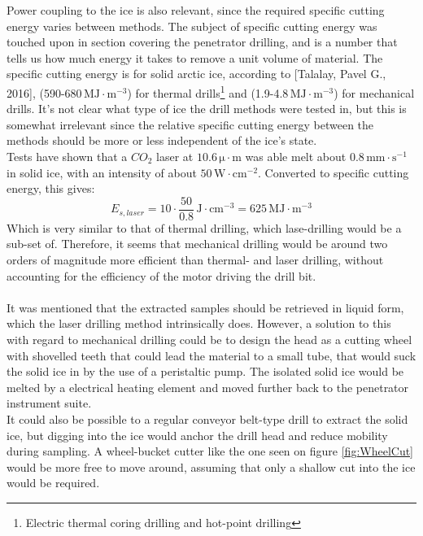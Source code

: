 Power coupling to the ice is also relevant, since the required specific cutting energy varies between methods. The subject of specific cutting energy was touched upon in section covering the penetrator drilling, and is a number that tells us how much energy it takes to remove a unit volume of material. The specific cutting energy is for solid arctic ice, according to [Talalay, Pavel G., 2016]\cite{IceDrill}, (590-680$\,\mathrm{MJ\cdot m^{-3}}$) for thermal drills\footnote{Electric thermal coring drilling and hot-point drilling } and (1.9-4.8$\,\mathrm{MJ\cdot m^{-3}}$) for mechanical drills. It's not clear what type of ice the drill methods were tested in, but this is somewhat irrelevant since the relative specific cutting energy between the methods should be more or less independent of the ice's state.\\ 
Tests have shown that a $CO_2$ laser at $10.6\,\mathrm{\mu\cdot m}$ was able melt about $0.8\,\mathrm{mm\cdot s^{-1}}$ in solid ice, with an intensity of about $50\,\mathrm{W\cdot cm^{-2}}$. Converted to specific cutting energy, this gives:
\begin{equation}
E_{s,laser}=10\cdot\frac{50}{0.8}\,\mathrm{J\cdot cm^{-3}}=625\,\mathrm{MJ \cdot m^{-3}}
\end{equation} 
Which is very similar to that of thermal drilling, which lase-drilling would be a sub-set of. Therefore, it seems that mechanical drilling would be around two orders of magnitude more efficient than thermal- and laser drilling, without accounting for the efficiency of the motor driving the drill bit. \\
\\
It was mentioned that the extracted samples should be retrieved in liquid form, which the laser drilling method intrinsically does. However, a solution to this with regard to mechanical drilling could be to design the head as a cutting wheel with shovelled teeth that could lead the material to a small tube, that would suck the solid ice in by the use of a peristaltic pump. The isolated solid ice would be melted by a electrical heating element and moved further back to the penetrator instrument suite. \\
It could also be possible to a regular conveyor belt-type drill to extract the solid ice, but digging into the ice would anchor the drill head and reduce mobility during sampling. A wheel-bucket cutter like the one seen on figure \ref{fig:WheelCut}  would be more free to move around, assuming that only a shallow cut into the ice would be required.  
